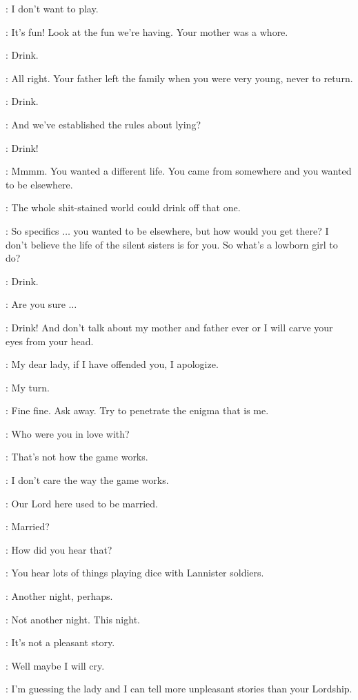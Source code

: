 \SHAE: I don't want to play. 

\TYRION: It's fun! Look at the fun we're having. Your mother was a whore. 

\SHAE: Drink. 

\TYRION: All right. Your father left the family when you were very young, never to return. 

\SHAE: Drink. 

\TYRION: And we've established the rules about lying? 

\SHAE: Drink! 

\TYRION: Mmmm. You wanted a different life. You came from somewhere and you wanted to be elsewhere. 

\BRONN: The whole shit-stained world could drink off that one. 

\TYRION: So specifics $\ldots$ you wanted to be elsewhere, but how would you get there? I don't believe the life of the silent sisters is for you. So what's a lowborn girl to do? 

\SHAE: Drink. 

\TYRION: Are you sure $\ldots$ 

\SHAE: Drink! And don't talk about my mother and father ever or I will carve your eyes from your head. 

\TYRION: My dear lady, if I have offended you, I apologize. 

\SHAE: My turn. 

\TYRION: Fine fine. Ask away. Try to penetrate the enigma that is me. 

\SHAE: Who were you in love with? 

\TYRION: That's not how the game works. 

\SHAE: I don't care the way the game works. 

\BRONN: Our Lord here used to be married. 

\SHAE: Married? 

\TYRION: How did you hear that? 

\BRONN: You hear lots of things playing dice with Lannister soldiers. 

\TYRION: Another night, perhaps. 

\SHAE: Not another night. This night. 

\TYRION: It's not a pleasant story. 

\SHAE: Well maybe I will cry. 

\BRONN: I'm guessing the lady and I can tell more unpleasant stories than your Lordship. 

